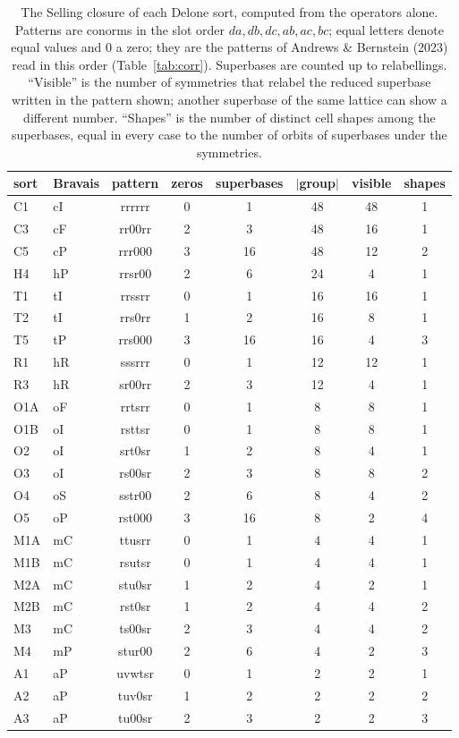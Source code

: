 \documentclass[preprint,pdf]{iucr}          %
\begin{document}
\begin{table}
\caption{The Selling closure of each Delone sort, computed from the operators alone. Patterns are conorms in the slot order $da,db,dc,ab,ac,bc$; equal letters denote equal values and $0$ a zero; they are the patterns of Andrews \& Bernstein (2023) read in this order (Table~\ref{tab:corr}). Superbases are counted up to relabellings. ``Visible'' is the number of symmetries that relabel the reduced superbase written in the pattern shown; another superbase of the same lattice can show a different number. ``Shapes'' is the number of distinct cell shapes among the superbases, equal in every case to the number of orbits of superbases under the symmetries.}
\label{tab:sorts}
\begin{footnotesize}
\begin{tabular}{llcccccc}
\toprule
sort & Bravais & pattern & zeros & superbases & $|$group$|$ & visible & shapes \\
\midrule
C1 & cI & rrrrrr & 0 & 1 & 48 & 48 & 1 \\
C3 & cF & rr00rr & 2 & 3 & 48 & 16 & 1 \\
C5 & cP & rrr000 & 3 & 16 & 48 & 12 & 2 \\
H4 & hP & rrsr00 & 2 & 6 & 24 & 4 & 1 \\
T1 & tI & rrssrr & 0 & 1 & 16 & 16 & 1 \\
T2 & tI & rrs0rr & 1 & 2 & 16 & 8 & 1 \\
T5 & tP & rrs000 & 3 & 16 & 16 & 4 & 3 \\
R1 & hR & sssrrr & 0 & 1 & 12 & 12 & 1 \\
R3 & hR & sr00rr & 2 & 3 & 12 & 4 & 1 \\
O1A & oF & rrtsrr & 0 & 1 & 8 & 8 & 1 \\
O1B & oI & rsttsr & 0 & 1 & 8 & 8 & 1 \\
O2 & oI & srt0sr & 1 & 2 & 8 & 4 & 1 \\
O3 & oI & rs00sr & 2 & 3 & 8 & 8 & 2 \\
O4 & oS & sstr00 & 2 & 6 & 8 & 4 & 2 \\
O5 & oP & rst000 & 3 & 16 & 8 & 2 & 4 \\
M1A & mC & ttusrr & 0 & 1 & 4 & 4 & 1 \\
M1B & mC & rsutsr & 0 & 1 & 4 & 4 & 1 \\
M2A & mC & stu0sr & 1 & 2 & 4 & 2 & 1 \\
M2B & mC & rst0sr & 1 & 2 & 4 & 4 & 2 \\
M3 & mC & ts00sr & 2 & 3 & 4 & 4 & 2 \\
M4 & mP & stur00 & 2 & 6 & 4 & 2 & 3 \\
A1 & aP & uvwtsr & 0 & 1 & 2 & 2 & 1 \\
A2 & aP & tuv0sr & 1 & 2 & 2 & 2 & 2 \\
A3 & aP & tu00sr & 2 & 3 & 2 & 2 & 3 \\
\bottomrule
\end{tabular}
\end{footnotesize}
\end{table}
\end{document}
